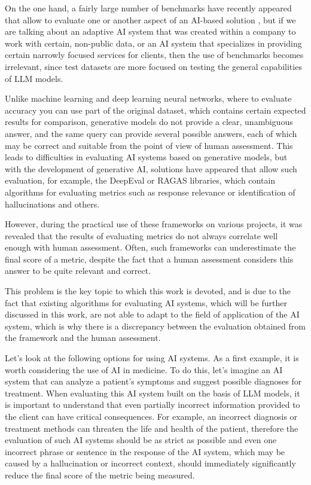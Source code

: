 \documentclass[sn-basic]{sn-jnl}
\theoremstyle{thmstyleone}%
\theoremstyle{thmstyletwo}%
\theoremstyle{thmstylethree}%
\begin{document}
On the one hand, a fairly large number of benchmarks have recently appeared that allow to evaluate one or another aspect of an AI-based solution \cite{White2024,Ivanov2024benchmarks,Wang2024usercentric}, but if we are talking about an adaptive AI system that was created within a company to work with certain, non-public data, or an AI system that specializes in providing certain narrowly focused services for clients, then the use of benchmarks becomes irrelevant, since test datasets are more focused on testing the general capabilities of LLM models.

Unlike machine learning and deep learning neural networks, where to evaluate accuracy you can use part of the original dataset, which contains certain expected results for comparison, generative models do not provide a clear, unambiguous answer, and the same query can provide several possible answers, each of which may be correct and suitable from the point of view of human assessment. This leads to difficulties in evaluating AI systems based on generative models, but with the development of generative AI, solutions have appeared that allow such evaluation, for example, the DeepEval or RAGAS \cite{Es2023} libraries, which contain algorithms for evaluating metrics such as response relevance or identification of hallucinations and others.

However, during the practical use of these frameworks on various projects, it was revealed that the results of evaluating metrics do not always correlate well enough with human assessment. Often, such frameworks can underestimate the final score of a metric, despite the fact that a human assessment considers this answer to be quite relevant and correct.

This problem is the key topic to which this work is devoted, and is due to the fact that existing algorithms for evaluating AI systems, which will be further discussed in this work, are not able to adapt to the field of application of the AI system, which is why there is a discrepancy between the evaluation obtained from the framework and the human assessment.

Let's look at the following options for using AI systems. As a first example, it is worth considering the use of AI in medicine. To do this, let's imagine an AI system that can analyze a patient's symptoms and suggest possible diagnoses for treatment. When evaluating this AI system built on the basis of LLM models, it is important to understand that even partially incorrect information provided to the client can have critical consequences. For example, an incorrect diagnosis or treatment methods can threaten the life and health of the patient, therefore the evaluation of such AI systems should be as strict as possible and even one incorrect phrase or sentence in the response of the AI system, which may be caused by a hallucination or incorrect context, should immediately significantly reduce the final score of the metric being measured.
\end{document}

